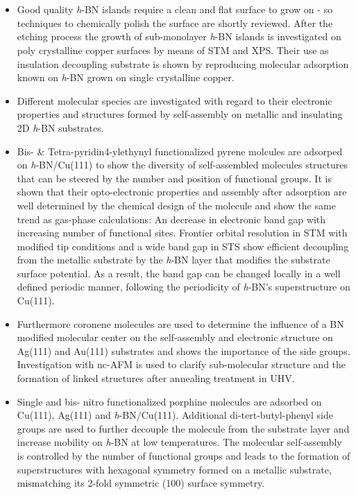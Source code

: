 \chapter{\abstractname}
\begin{itemize}
	\item Good quality \textit{h}-BN islands require a clean and flat surface to grow on - so techniques to chemically polish the surface are shortly reviewed. After the etching process the growth of sub-monolayer \textit{h}-BN islands is investigated on poly crystalline copper surfaces by means of STM and XPS. Their use as insulation decoupling substrate is shown by reproducing molecular adsorption known on \textit{h}-BN grown on single crystalline copper.
	\item Different molecular species are investigated with regard to their electronic properties and structures formed by self-assembly on metallic and insulating 2D \textit{h}-BN substrates.
	\item Bis- \& Tetra-pyridin4-ylethynyl functionalized pyrene molcules are adsorped on \textit{h}-BN/Cu(111)  to show the diversity of self-assembled molecules structures that can be steered by the number and position of functional groups. It is shown that their opto-electronic properties and assembly after adsorption are well determined by the chemical design of the molecule and show the same trend as gas-phase calculations: An decrease in electronic band gap with increasing number of functional sites. Frontier orbital resolution in STM with modified tip conditions and a wide band gap in STS show efficient decoupling from the metallic substrate by the \textit{h}-BN layer that modifies the substrate surface potential. As a result, the band gap can be changed locally in a well defined periodic manner, following the periodicity of \textit{h}-BN's superstructure on Cu(111).
	\item Furthermore coronene molecules are used to determine the influence of a BN modified molecular center on the self-assembly and electronic structure on Ag(111) and Au(111) substrates and shows the importance of the side groups. Investigation with nc-AFM is used to clarify sub-molecular structure and the formation of linked structures after annealing treatment in UHV.
	\item Single and bis- nitro functionalized porphine molecules are adsorbed on Cu(111), Ag(111) and \textit{h}-BN/Cu(111). Additional di-tert-butyl-phenyl side groups are used to further decouple the molecule from the substrate layer and increase mobility on \textit{h}-BN at low temperatures. The molecular self-assembly is controlled by the number of functional groups and leads to the formation of superstructures with hexagonal symmetry formed on a metallic substrate, mismatching its 2-fold symmetric (100) surface symmetry.

\end{itemize}
